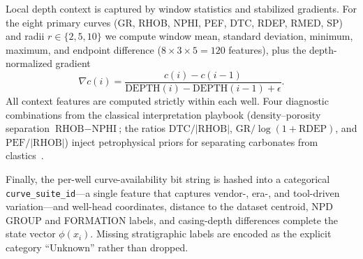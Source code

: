 \documentclass[bdcc,article,submit,pdftex,moreauthors]{Definitions/mdpi}
\begin{document}
Local depth context is captured by window statistics and stabilized gradients. For the eight
primary curves (GR, RHOB, NPHI, PEF, DTC, RDEP, RMED, SP) and radii $r\in\{2,5,10\}$ we
compute window mean, standard deviation, minimum, maximum, and endpoint difference
($8\!\times\!3\!\times\!5=120$ features), plus the depth-normalized gradient
\begin{equation}
\nabla c(i) = \frac{c(i)-c(i-1)}{\text{DEPTH}(i)-\text{DEPTH}(i-1)+\epsilon}.
\label{eq:grad}
\end{equation}
All context features are computed strictly within each well. Four diagnostic combinations
from the classical interpretation playbook (density--porosity separation $\text{RHOB}-\text{NPHI}$;
the ratios $\text{DTC}/|\text{RHOB}|$, $\text{GR}/\log(1+\text{RDEP})$, and
$\text{PEF}/|\text{RHOB}|$) inject petrophysical priors for separating carbonates from
clastics~\cite{rider2011,doveton2014}.

Finally, the per-well curve-availability bit string is hashed into a categorical
\texttt{curve\_suite\_id}---a single feature that captures vendor-, era-, and tool-driven
variation---and well-head coordinates, distance to the dataset centroid, NPD GROUP and
FORMATION labels, and casing-depth differences complete the state vector $\phi(x_i)$. Missing
stratigraphic labels are encoded as the explicit category ``Unknown'' rather than dropped.
\end{document}
